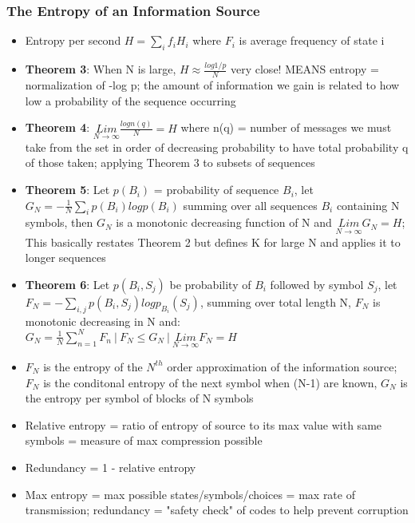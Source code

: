 \documentclass[leqno,twocolumn]{article}
\begin{document}
\subsubsection{The Entropy of an Information Source}
\begin{itemize}
\item Entropy per second $H = \sum_i f_iH_i$ where $F_i$ is average frequency of state i
\item \textbf{Theorem 3}: When N is large, $H \approx \frac{log 1/p}{N}$ very close! MEANS entropy = normalization of -log p; the amount of information we gain is related to how low a probability of the sequence occurring
\item \textbf{Theorem 4}: $\underset{N \rightarrow \infty}{Lim} \frac{log n(q)}{N} = H$ where n(q) = number of messages we must take from the set in order of decreasing probability to have total probability q of those taken; applying Theorem 3 to subsets of sequences
\item \textbf{Theorem 5}: Let $p(B_i)$ = probability of sequence $B_i$, let $G_N = -\frac{1}{N} \sum_i p(B_i) log p(B_i)$ summing over all sequences $B_i$ containing N symbols, then $G_N$ is a monotonic decreasing function of N and $\underset{N \rightarrow \infty}{Lim} G_N = H$; This basically restates Theorem 2 but defines K for large N and applies it to longer sequences
\item \textbf{Theorem 6}: Let $p(B_i,S_j)$ be probability of $B_i$ followed by symbol $S_j$, let $F_N = -\sum_{i,j} p(B_i,S_j) log p_{B_i}(S_j)$, summing over total length N, $F_N$ is monotonic decreasing in N and:\\
$G_N = \frac{1}{N} \sum_{n=1}^N F_n \: | \: F_N \leq G_N \: | \: \underset{N \rightarrow \infty}{Lim} F_N = H$
\item $F_N$ is the entropy of the $N^{th}$ order approximation of the information source; $F_N$ is the conditonal entropy of the next symbol when (N-1) are known, $G_N$ is the entropy per symbol of blocks of N symbols
\item Relative entropy = ratio of entropy of source to its max value with same symbols = measure of max compression possible
\item Redundancy = 1 - relative entropy
\item Max entropy = max possible states/symbols/choices = max rate of transmission; redundancy = "safety check" of codes to help prevent corruption
\end{itemize}
\end{document}
